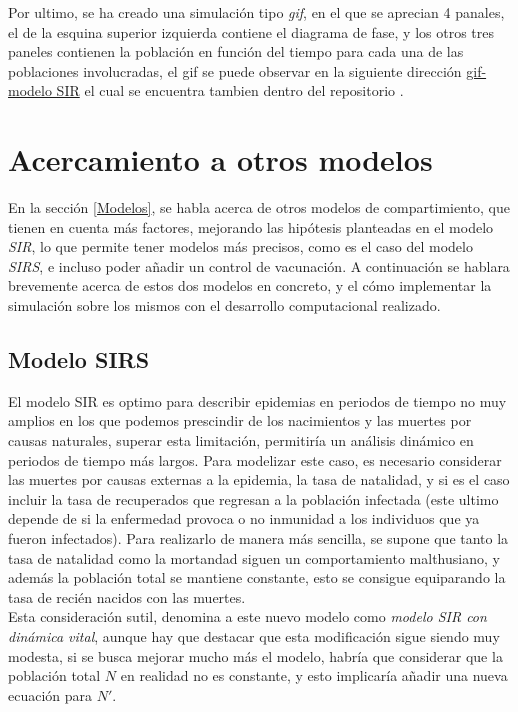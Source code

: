 \documentclass[journal]{IEEEtran}
\begin{document}
Por ultimo, se ha creado una simulación tipo \textit{gif}, en el que se aprecian 4 panales, el de la 
esquina superior izquierda contiene el diagrama de fase, y los otros tres paneles 
contienen la población en función del tiempo para cada una de las poblaciones involucradas, 
el gif se puede observar en la siguiente dirección \href{https://github.com/niaggar/propagacion-de-enfermedades-project}{gif-modelo SIR} 
el cual se encuentra tambien dentro del repositorio \cite{GitHub}.

\section{Acercamiento a otros modelos}
En la sección \ref{Modelos}, se habla acerca de otros modelos de compartimiento, que tienen en cuenta más factores,
mejorando las hipótesis planteadas en el modelo \textit{SIR}, lo que permite
tener modelos más precisos, como es el caso del modelo \textit{SIRS}, e incluso poder añadir
un control de vacunación. A continuación se hablara brevemente acerca de estos dos modelos en concreto,
y el cómo implementar la simulación sobre los mismos con el desarrollo computacional realizado.

\subsection{Modelo SIRS}\label{Modelo SIRS}
El modelo SIR es optimo para describir epidemias en periodos de tiempo no muy amplios
en los que podemos prescindir de los nacimientos y las muertes por causas naturales, superar esta limitación,
permitiría un análisis dinámico en periodos de tiempo más largos. 
Para modelizar este caso, es necesario considerar las muertes por causas externas a la epidemia,
la tasa de natalidad, y si es el caso incluir la tasa de recuperados que regresan a la población infectada (este ultimo depende 
de si la enfermedad provoca o no inmunidad a los individuos que ya fueron infectados). Para realizarlo de manera
más sencilla, se supone que tanto la tasa de natalidad como la mortandad 
siguen un comportamiento malthusiano, y además la población total se mantiene constante, esto se consigue equiparando la
tasa de recién nacidos con las muertes.\\ 

Esta consideración sutil, denomina a este nuevo modelo como \textit{modelo SIR con dinámica vital}\cite{SIRS-VAC}, aunque 
hay que destacar que esta modificación sigue siendo muy modesta, si se busca mejorar mucho más el modelo, 
habría que considerar que la población total $N$ en realidad no es constante, y esto implicaría añadir una nueva
ecuación para $N'$.
\end{document}
